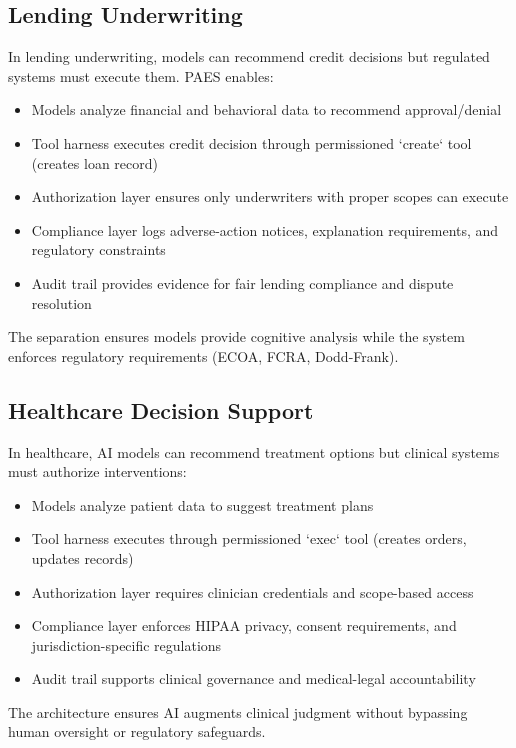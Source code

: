 \documentclass[11pt,a4paper]{article}
\begin{document}
\subsection{Lending Underwriting}

In lending underwriting, models can recommend credit decisions but regulated systems must execute them. PAES enables:

\begin{itemize}
    \item Models analyze financial and behavioral data to recommend approval/denial
    \item Tool harness executes credit decision through permissioned `create` tool (creates loan record)
    \item Authorization layer ensures only underwriters with proper scopes can execute
    \item Compliance layer logs adverse-action notices, explanation requirements, and regulatory constraints
    \item Audit trail provides evidence for fair lending compliance and dispute resolution
\end{itemize}

The separation ensures models provide cognitive analysis while the system enforces regulatory requirements (ECOA, FCRA, Dodd-Frank).

\subsection{Healthcare Decision Support}

In healthcare, AI models can recommend treatment options but clinical systems must authorize interventions:

\begin{itemize}
    \item Models analyze patient data to suggest treatment plans
    \item Tool harness executes through permissioned `exec` tool (creates orders, updates records)
    \item Authorization layer requires clinician credentials and scope-based access
    \item Compliance layer enforces HIPAA privacy, consent requirements, and jurisdiction-specific regulations
    \item Audit trail supports clinical governance and medical-legal accountability
\end{itemize}

The architecture ensures AI augments clinical judgment without bypassing human oversight or regulatory safeguards.
\end{document}
